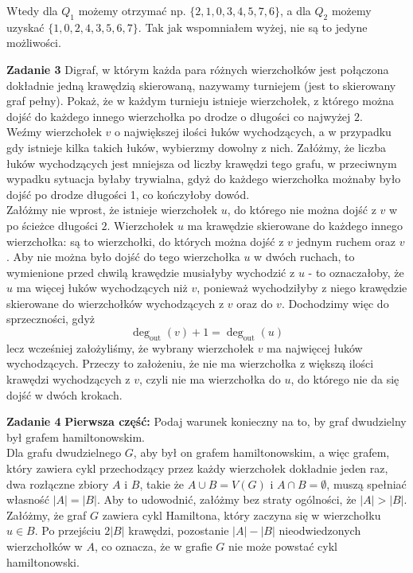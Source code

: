 \documentclass[a4paper,12pt]{article}
\newcommand{\abs}[1]{\left| #1 \right|}					%
\begin{document}
\noindent Wtedy dla $Q_1$ możemy otrzymać np. $\{ 2, 1, 0, 3, 4, 5, 7, 6 \}$, a dla $Q_2$
możemy uzyskać $\{ 1, 0, 2, 4, 3, 5, 6, 7 \}$. Tak jak wspomniałem wyżej, nie są to jedyne
możliwości.

\newpage
\noindent \textbf{Zadanie 3} \newline
Digraf, w którym każda para różnych wierzchołków jest połączona dokładnie jedną krawędzią
skierowaną, nazywamy turniejem (jest to skierowany graf pełny). Pokaż, że w każdym turnieju
istnieje wierzchołek, z którego można dojść do każdego innego wierzchołka po drodze 
o długości co najwyżej $2$. \\

\noindent Weźmy wierzchołek $v$ o największej ilości łuków wychodzących, a w przypadku gdy
istnieje kilka takich łuków, wybierzmy dowolny z nich. Załóżmy, że liczba łuków wychodzących
jest mniejsza od liczby krawędzi tego grafu, w przeciwnym wypadku sytuacja byłaby trywialna,
gdyż do każdego wierzchołka możnaby było dojść po drodze długości 1, co kończyłoby dowód. \\

\noindent Załóżmy nie wprost, że istnieje wierzchołek $u$, do którego nie można dojść z $v$
w po ścieżce długości $2$. Wierzchołek $u$ ma krawędzie skierowane do każdego innego
wierzchołka: są to wierzchołki, do których można dojść z $v$ jednym ruchem oraz $v$. Aby
nie można było dojść do tego wierzchołka $u$ w dwóch ruchach, to wymienione przed chwilą
krawędzie musiałyby wychodzić z $u$ - to oznaczałoby, że $u$ ma więcej łuków wychodzących 
niż $v$, ponieważ wychodziłyby z niego krawędzie skierowane do wierzchołków wychodzących z $v$
oraz do $v$. Dochodzimy więc do sprzeczności, gdyż 
\[
    \deg_{\text{out}}(v) + 1 = \deg_{\text{out}}(u) 
\]
lecz wcześniej założyliśmy, że wybrany wierzchołek $v$ ma najwięcej łuków wychodzących.
Przeczy to założeniu, że nie ma wierzchołka z większą ilości krawędzi wychodzących z $v$,
czyli nie ma wierzchołka do $u$, do którego nie da się dojść w dwóch krokach.

\noindent \newline \textbf{Zadanie 4} \newline
\textbf{Pierwsza część:} Podaj warunek konieczny na to, by graf dwudzielny był grafem 
hamiltonowskim. \\

\noindent Dla grafu dwudzielnego $G$, aby był on grafem hamiltonowskim, a więc grafem,
który zawiera cykl przechodzący przez każdy wierzchołek dokładnie jeden raz,
dwa rozłączne zbiory $A$ i $B$, takie że $A \cup B = V(G)$ i $A \cap B = \emptyset$,
muszą spełniać własność $\abs{A} = \abs{B}$. Aby to udowodnić, załóżmy bez straty ogólności, 
że $\abs{A} > \abs{B}$. Załóżmy, że graf $G$ zawiera cykl Hamiltona, który zaczyna się 
w wierzchołku $u \in B$. Po przejściu $2 \abs{B}$ krawędzi, pozostanie $\abs{A} - \abs{B}$ 
nieodwiedzonych wierzchołków w $A$, co oznacza, że w grafie $G$ nie może powstać cykl 
hamiltonowski. \\
\end{document}
